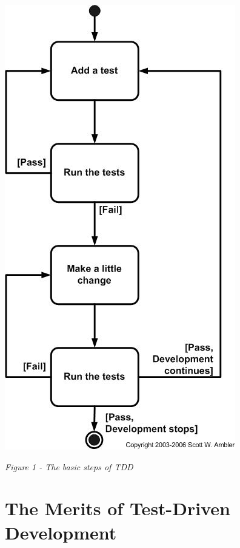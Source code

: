 \documentclass{scrartcl}
\begin{document}
\begin{center}
\includegraphics[scale=0.5]{tddSteps.png}
\end{center}

\begin{center}
\textit{Figure 1 - The basic steps of TDD}
\end{center}

\section*{The Merits of Test-Driven Development}
\end{document}
